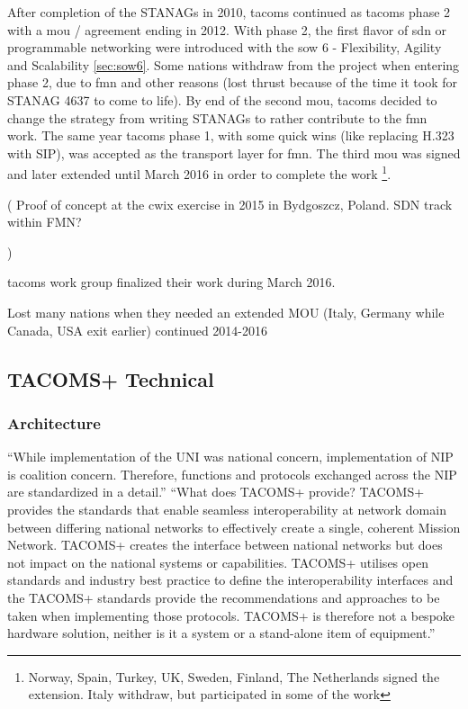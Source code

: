 After completion of  the STANAGs in 2010, \gls{tacoms} continued as \gls{tacoms} phase 2 with a \gls{mou} / agreement ending in 2012. With phase 2, the first flavor of \gls{sdn} or programmable networking were introduced with the \gls{sow} 6 - Flexibility, Agility and Scalability \ref{sec:sow6}. Some nations withdraw from the project when entering phase 2, due to \gls{fmn} and other reasons (lost thrust because of the time it took for STANAG 4637 to come to life).  By end of the second \gls{mou}, \gls{tacoms} decided to change the strategy from writing STANAGs to rather contribute to the \gls{fmn} work. The same year \gls{tacoms} phase 1, with some quick wins (like replacing H.323 with SIP), was accepted as the transport layer for \gls{fmn}. The third \gls{mou} was signed and later extended until March 2016 in order to complete the work \footnote{Norway, Spain, Turkey, UK, Sweden, Finland, The Netherlands signed the extension. Italy withdraw, but participated in some of the work}. 

( 
Proof of concept at the \gls{cwix} exercise in 2015 in Bydgoszcz, Poland.
SDN track within FMN?
 
)

\gls{tacoms} work group finalized their work during March 2016. 

Lost many nations when they needed an extended MOU (Italy, Germany while Canada, USA exit earlier) 
 continued 2014-2016 

\subsection{TACOMS+ Technical}
\subsubsection{Architecture}
“While implementation of the UNI was national concern, implementation of NIP is coalition concern. Therefore, functions and protocols exchanged across the NIP are standardized in a detail.” 
“What does TACOMS+ provide?
TACOMS+ provides the standards that enable seamless interoperability at network domain between differing national networks to effectively create a single, coherent Mission Network. TACOMS+ creates the interface between national networks but does not impact on the national systems or capabilities. TACOMS+ utilises open standards and industry best practice to define the interoperability interfaces and the TACOMS+ standards provide the recommendations and approaches to be taken when implementing those protocols. TACOMS+ is therefore not a bespoke hardware solution, neither is it a system or a stand-alone item of equipment.”
\cite{tacoms_architecture_concept}

